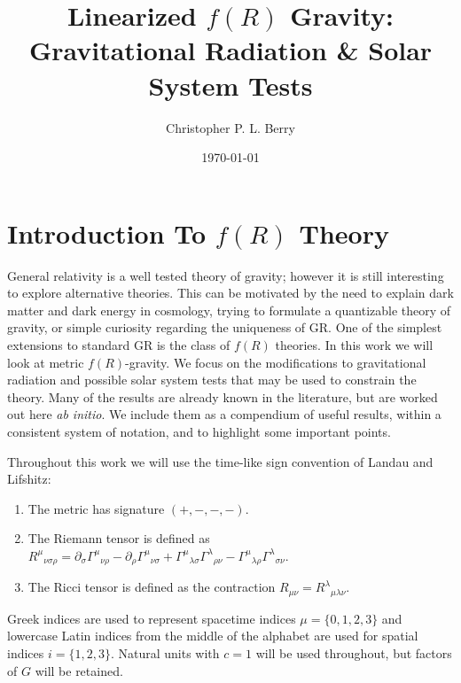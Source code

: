 \documentclass[aps,prd,reprint,showpacs]{revtex4-1}
\begin{document}

\title{Linearized $f(R)$ Gravity: Gravitational Radiation \& Solar System Tests}

\author{Christopher P. L. Berry}

\date{\today}

\begin{abstract}

\end{abstract}

\pacs{}

\maketitle

\section{Introduction To $f(R)$ Theory}

General relativity is a well tested theory of gravity\cite{Will2006}; however it is still interesting to explore alternative theories. This can be motivated by the need to explain dark matter and dark energy in cosmology, trying to formulate a quantizable theory of gravity, or simple curiosity regarding the uniqueness of GR. One of the simplest extensions to standard GR is the class of $f(R)$ theories\cite{Sotiriou2010, DeFelice2010}. In this work we will look at metric $f(R)$-gravity. We focus on the modifications to gravitational radiation and possible solar system tests that may be used to constrain the theory. Many of the results are already known in the literature, but are worked out here {\it ab initio}. We include them as a compendium of useful results, within a consistent system of notation, and to highlight some important points.

Throughout this work we will use the time-like sign convention of Landau and Lifshitz\cite{Landau1975}:
\begin{enumerate}
\item The metric has signature $(+,-,-,-)$.
\item The Riemann tensor is defined as ${R^\mu}_{\nu\sigma\rho} = \partial_\sigma {\Gamma^\mu}_{\nu\rho} - \partial_\rho {\Gamma^\mu}_{\nu\sigma} + {\Gamma^\mu}_{\lambda\sigma}{\Gamma^\lambda}_{\rho\nu} - {\Gamma^\mu}_{\lambda\rho}{\Gamma^\lambda}_{\sigma\nu}$.
\item The Ricci tensor is defined as the contraction $R_{\mu\nu} = {R^\lambda}_{\mu\lambda\nu}$.
\end{enumerate}
Greek indices are used to represent spacetime indices $\mu = \{0,1,2,3\}$ and lowercase Latin indices from the middle of the alphabet are used for spatial indices $i = \{1,2,3\}$. Natural units with $c = 1$ will be used throughout, but factors of $G$ will be retained.
\end{document}
